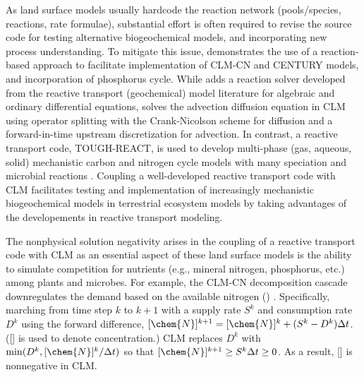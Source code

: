 \documentclass[gmd, manuscript]{copernicus}
\begin{document}
As land surface models usually hardcode the reaction network (pools/species,
reactions, rate formulae), substantial effort is often required to revise the
source code for testing alternative biogeochemical models, and incorporating new
process understanding. To mitigate this issue, \citet{Fang2013} demonstrates
the use of a reaction-based approach to facilitate implementation of CLM-CN and
CENTURY models, and incorporation of phosphorus cycle. While \citet{Fang2013}
adds a reaction solver developed from the reactive transport (geochemical)
model literature for algebraic and ordinary differential equations,
\citet{Tang2013b} solves the advection diffusion equation in CLM using operator
splitting with the Crank-Nicolson scheme for diffusion and a forward-in-time
upstream discretization for advection. In contrast, a reactive transport code,
TOUGH-REACT, is used to develop multi-phase (gas, aqueous, solid) mechanistic
carbon and nitrogen cycle models with many speciation and microbial reactions
\citep{Maggi2008,Gu2010,Riley2014}. Coupling a well-developed reactive
transport code \citep[e.g.,][]{Steefel2014} with CLM facilitates testing
and implementation of increasingly mechanistic biogeochemical models in
terrestrial ecosystem models by taking advantages of the developements in
reactive transport modeling.


The nonphysical solution negativity arises in the coupling of a reactive transport code
with CLM as an essential aspect of these land surface models is the ability to simulate
competition for nutrients (e.g., mineral nitrogen, phosphorus, etc.) among
plants and microbes. For example, the CLM-CN decomposition cascade
downregulates the demand based on the available nitrogen ()
\citep{Oleson2013,Thornton2005}. Specifically, marching from time step $k$ to
$k+1$ with a supply rate $S^k$ and consumption rate $D^k$ using the forward
difference, $[\chem{N}]^{k+1} = [\chem{N}]^k + (S^k - D^k) \Delta t$. ([] is
used to denote concentration.) CLM replaces $D^k$ with $\min(D^k,
[\chem{N}]^k/\Delta t)$ so that $[\chem{N}]^{k+1} \geq S^k \Delta t \geq 0$. As
a result, [] is nonnegative in CLM.
 
\end{document}
